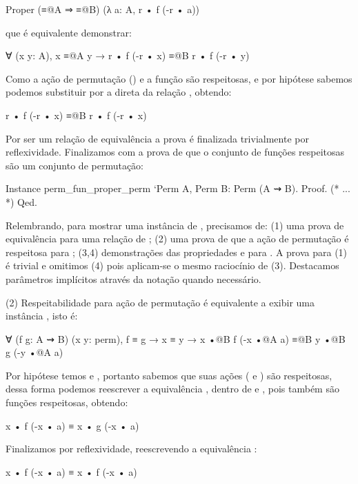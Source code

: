 \begin{description}
	\begin{coqcode}
Proper (≡@{A} ⇒ ≡@{B}) (λ a: A, r • f (-r • a))
	\end{coqcode}
	que é equivalente demonstrar:
	\begin{coqcode}
∀ (x y: A), x ≡@{A} y → r • f (-r • x) ≡@{B} r • f (-r • y)
 	\end{coqcode}
 	Como a ação de permutação () e a função  são respeitosas, e por hipótese sabemos  podemos substituir  por  a direta da relação , obtendo:
	\begin{coqcode}
r • f (-r • x) ≡@{B} r • f (-r • x)
    \end{coqcode}
	Por  ser um relação de equivalência a prova é finalizada trivialmente por reflexividade. Finalizamos com a prova de que o conjunto de funções respeitosas são um conjunto de permutação:
	\begin{coqcode}
Instance perm_fun_proper_perm `{Perm A, Perm B}: Perm (A ⇝ B).
Proof. (* ... *) Qed.
	\end{coqcode}
	Relembrando, para mostrar uma instância de , precisamos de: (1) uma prova de equivalência para uma relação de ; (2) uma prova de que a ação de permutação é respeitosa para ; (3,4) demonstrações das propriedades  e  para . A prova para (1) é trivial e omitimos (4) pois aplicam-se o mesmo raciocínio de (3). Destacamos parâmetros implícitos através da notação  quando necessário.
	
	(2) Respeitabilidade para ação de permutação é equivalente a exibir uma instância , isto é:
	\begin{coqcode}
∀ (f g: A ⇝ B) (x y: perm), f ≡ g → x ≡ y → 
   x •@{B} f (-x •@{A} a) ≡@{B} y •@{B} g (-y •@{A} a)
	\end{coqcode}
	Por hipótese temos  e , portanto sabemos que suas ações ( e ) são respeitosas, dessa forma podemos reescrever a equivalência , dentro de  e , pois também são funções respeitosas, obtendo:
    \begin{coqcode}
x • f (-x • a) ≡ x • g (-x • a)
    \end{coqcode}
	Finalizamos por reflexividade, reescrevendo a equivalência :
	\begin{coqcode}
x • f (-x • a) ≡ x • f (-x • a)
	\end{coqcode}


\end{description}

